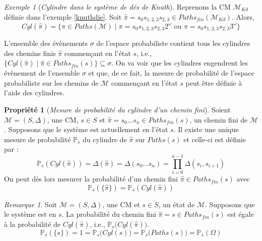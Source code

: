 \documentclass[12pt,a4paper]{report}
\theoremstyle{definition}%
\newtheorem{propriete}{Propriété}[chapter]
\theoremstyle{remark}
\newtheorem{example}{Exemple}[chapter]
\newtheorem{remark}{Remarque}[chapter]
\newcommand{\ie}{i.e., }
\newcommand{\pr}{\mathbb{P}}
\begin{document}
\begin{example}[\textit{Cylindre dans le système de dés de Knuth}]
	Reprenons la CM $\mathcal{M}_{Kd}$ définie dans l'exemple \ref{knuthdie}. Soit $\hat{\pi} = s_0s_{1, 2, 3}s_{2, 3} \in Paths_{fin}(\mathcal{M}_{Kd})$. Alors, \[Cyl(\hat{\pi}) = \{ \pi \in Paths(\mathcal{M}) \; | \; \pi = s_0s_{1, 2, 3}s_{2, 3} 2^\omega \text{ ou } \pi = s_0s_{1, 2, 3}s_{2, 3} 3^\omega \} \]
\end{example}

L'ensemble des évènements $\sigma$ de l'espace probabiliste contient tous les
cylindres des chemins finis $\hat{\pi}$ commençant en l'état $s$, i.e.,
$\{Cyl(\hat{\pi}) \; | \; \hat{\pi} \in Paths_{fin}(s)\} \subseteq \sigma$.
On va voir que les cylindres engendrent les évènement de l'ensemble $\sigma$ et
que, de ce fait, la mesure de probabilité de l'espace probabiliste sur les chemins
de $\mathcal{M}$ commençant en l'état $s$ peut être définie à l'aide des cylindres.

\begin{propriete}[\textit{Mesure de probabilité du cylindre d'un chemin fini}]
	Soient $\mathcal{M} = (S, \Delta)$, une CM, $s \in S$ et $\hat{\pi} = s_0 \dots s_n \in Paths_{fin}(s)$, un chemin fini de $\mathcal{M}$. Supposons que le système est actuellement en l'état $s$. Il existe une unique mesure de probabilité $\pr_s$ du cylindre de $\hat{\pi}$ sur $Paths(s)$
	et celle-ci est définie par :
	\[\pr_{s}(Cyl(\hat{\pi})) = \Delta(\hat{\pi}) = \Delta(s_0 \dots s_n) = \prod_{i = 0}^{n - 1} \Delta(s_i, s_{i+1})\]
	On peut dès lors mesurer la probabilité d'un chemin fini $\hat{\pi} \in Paths_{fin}(s)$ avec
\[ \pr_s(\{\hat{\pi}\}) = \pr_s(Cyl(\hat{\pi})) \]
\end{propriete}

\begin{remark}
	Soit $\mathcal{M} = (S, \Delta)$, une CM et $s \in S$, un état de $\mathcal{M}$. Supposons que le système est en $s$. La probabilité du chemin fini $\hat{\pi} = s \in Paths_{fin}(s)$ est égale à la probabilité de $Cyl(\hat{\pi})$, \ie $\pr_s\big(Cyl(\hat{\pi})\big)$.
	\[
		\pr_s(\{s\}) = 1 = \pr_s\big(Cyl(s)\big) = \pr_s\big(Paths(s)\big) = \pr_s(\Omega)
	\]
\end{remark}
\end{document}
